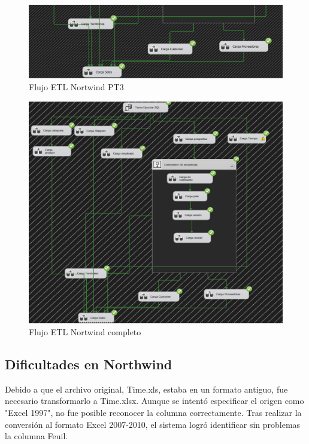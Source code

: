 \documentclass[12pt, a4paper, twoside]{article}
\begin{document}
	\begin{figure}[H]
		\centering
		\includegraphics[width=1\textwidth]{image/flujo_north_3.png}
		\caption{Flujo ETL Nortwind PT3}
		\label{fig:7}
	\end{figure}
	
	
	\begin{figure}[H]
		\centering
		\includegraphics[width=1\textwidth]{image/flujo_north_completo.png}
		\caption{Flujo ETL Nortwind completo}
		\label{fig:8}
	\end{figure}
	

	
	\subsection{Dificultades en Northwind}
	
	Debido a que el archivo original, Time.xls, estaba en un formato antiguo, fue necesario transformarlo a Time.xlsx. Aunque se intentó especificar el origen como "Excel 1997", no fue posible reconocer la columna correctamente. Tras realizar la conversión al formato Excel 2007-2010, el sistema logró identificar sin problemas la columna Feuil.
	
\end{document}
